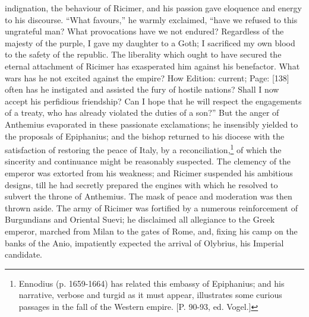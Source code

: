 indignation, the behaviour of Ricimer, and his passion gave eloquence and energy to his discourse. \texthebrew{“}What favours,\texthebrew{}” he warmly exclaimed, \texthebrew{“}have we refused to this ungrateful man? What provocations have we not endured? Regardless of the majesty of the purple, I gave my daughter to a Goth; I sacrificed my own blood to the safety of the republic. The liberality which ought to have secured the eternal attachment of Ricimer has exasperated him against his benefactor. What wars has he not excited against the empire? How Edition: current; Page: [138] often has he instigated and assisted the fury of hostile nations? Shall I now accept his perfidious friendship? Can I hope that he will respect the engagements of a treaty, who has already violated the duties of a son?\texthebrew{}” But the anger of Anthemius evaporated in these passionate exclamations; he insensibly yielded to the proposals of Epiphanius; and the bishop returned to his diocese with the satisfaction of restoring the peace of Italy, by a reconciliation,\footnote{Ennodius (p. 1659-1664) has related this embassy of Epiphanius; and his narrative, verbose and turgid as it must appear, illustrates some curious passages in the fall of the Western empire. [P. 90-93, ed. Vogel.]} of which the sincerity and continuance might be reasonably suspected. The clemency of the emperor was extorted from his weakness; and Ricimer suspended his ambitious designs, till he had secretly prepared the engines with which he resolved to subvert the throne of Anthemius. The mask of peace and moderation was then thrown aside. The army of Ricimer was fortified by a numerous reinforcement of Burgundians and Oriental Suevi; he disclaimed all allegiance to the Greek emperor, marched from Milan to the gates of Rome, and, fixing his camp on the banks of the Anio, impatiently expected the arrival of Olybrius, his Imperial candidate.

